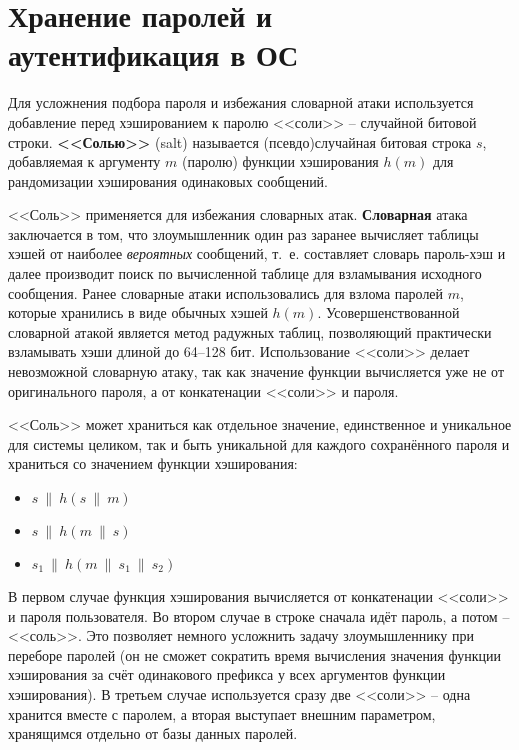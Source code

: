 \section[Хранение паролей и аутентификация в ОС]{Хранение паролей и \protect\\ аутентификация в ОС}

Для усложнения подбора пароля и избежания словарной атаки используется добавление перед хэшированием к паролю <<соли>> -- случайной битовой строки. \textbf{<<Солью>>} (salt) называется (псевдо)случайная битовая строка $s$, добавляемая к аргументу $m$ (паролю) функции хэширования $h(m)$ для рандомизации хэширования одинаковых сообщений.

<<Соль>> применяется для избежания словарных атак. \textbf{Словарная} атака заключается в том, что злоумышленник один раз заранее вычисляет таблицы хэшей от наиболее \emph{вероятных} сообщений, т.~е. составляет словарь пароль-хэш и далее производит поиск по вычисленной таблице для взламывания исходного сообщения. Ранее словарные атаки использовались для взлома паролей $m$, которые хранились в виде обычных хэшей $h(m)$. Усовершенствованной словарной атакой является метод радужных таблиц, позволяющий практически взламывать хэши длиной до 64--128 бит. Использование <<соли>> делает невозможной словарную атаку, так как значение функции вычисляется уже не от оригинального пароля, а от конкатенации <<соли>> и пароля.

<<Соль>> может храниться как отдельное значение, единственное и уникальное для системы целиком, так и быть уникальной для каждого сохранённого пароля и храниться со значением функции хэширования:
\begin{itemize}
	\item $s ~\|~ h(s ~\|~ m)$
	\item $s ~\|~ h(m ~\|~ s)$
	\item $s_1 ~\|~ h(m ~\|~ s_1 ~\|~ s_2)$
\end{itemize}

В первом случае функция хэширования вычисляется от конкатенации <<соли>> и пароля пользователя. Во втором случае в строке сначала идёт пароль, а потом -- <<соль>>. Это позволяет немного усложнить задачу злоумышленнику при переборе паролей (он не сможет сократить время вычисления значения функции хэширования за счёт одинакового префикса у всех аргументов функции хэширования). В третьем случае используется сразу две <<соли>> -- одна хранится вместе с паролем, а вторая выступает внешним параметром, хранящимся отдельно от базы данных паролей.

